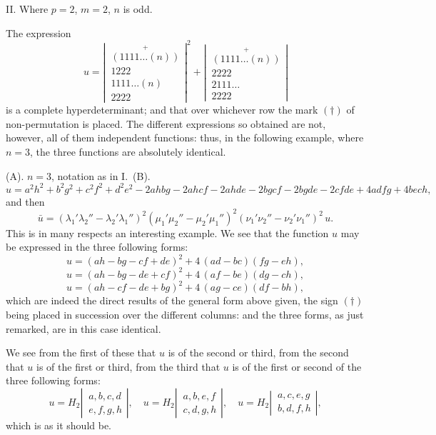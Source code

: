 \documentclass[11pt]{article}
\begin{document}
\bigskip
II. Where $p=2$, $m=2$, $n$ is odd.

The expression
\[
u = \left|\,
\begin{array}{c}
\overset{+}{(1111\ldots(n))}\\
\hline
1222\\
\hline
1111\ldots(n)\\
\hline
2222
\end{array}
\right|^2 + \left|\,
\begin{array}{c}
\overset{+}{(1111\ldots(n))}\\
\hline
2222\\
\hline
2111\ldots\\
\hline
2222
\end{array}
\right|
\]
is a complete hyperdeterminant; and that over whichever row the mark $(\dagger)$ of non-permutation
is placed. The different expressions so obtained are not, however, all of them
independent functions: thus, in the following example, where $n=3$, the three functions
are absolutely identical.

(A). $n=3$, notation as in I.~(B).
\[
u = a^2 h^2 + b^2 g^2 + c^2 f^2 + d^2 e^2 - 2ahbg - 2ahcf - 2ahde - 2bgcf - 2bgde - 2cfde + 4adfg + 4bech,
\]
and then
\[
\bar{u} = (\lambda_1'\lambda_2'' - \lambda_2'\lambda_1'')^2(\mu_1'\mu_2'' - \mu_2'\mu_1'')^2(\nu_1'\nu_2'' - \nu_2'\nu_1'')^2\,u.
\]
This is in many respects an interesting example. We see that the function $u$
may be expressed in the three following forms:
\[
u = (ah - bg - cf + de)^2 + 4\,(ad - bc)(fg - eh) \tag{1},
\]
\[
u = (ah - bg - de + cf)^2 + 4\,(af - be)(dg - ch) \tag{2},
\]
\[
u = (ah - cf - de + bg)^2 + 4\,(ag - ce)(df - bh) \tag{3},
\]
which are indeed the direct results of the general form above given, the sign $(\dagger)$
being placed in succession over the different columns: and the three forms, as just
remarked, are in this case identical.

We see from the first of these that $u$ is of the second or third, from the second
that $u$ is of the first or third, from the third that $u$ is of the first or second of the
three following forms:
\[
u = H_2\!\left|\,\begin{array}{cc} a, b, c, d \\ e, f, g, h \end{array}\right|,\quad
u = H_2\!\left|\,\begin{array}{cc} a, b, e, f \\ c, d, g, h \end{array}\right|,\quad
u = H_2\!\left|\,\begin{array}{cc} a, c, e, g \\ b, d, f, h \end{array}\right|,
\]
which is as it should be.
\end{document}
